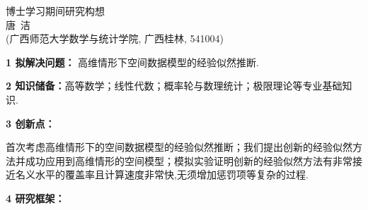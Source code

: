\documentclass[cs4size]{article}
\renewcommand{\thefootnote}{\fnsymbol{footnote}}
\begin{document}
\setcounter{page}{1} %
\fancyhf{} %
\renewcommand\headrulewidth{0.4pt} %
\begin{center}
{{\LARGE\heiti 博士学习期间研究构想}\\[0.6cm]
{\normalsize 唐\ 洁\footnotemark[1]}\\[0.1cm]}
{\small(广西师范大学数学与统计学院, 广西桂林, 541004)}
\end{center}
\renewcommand{\thefootnote}{\fnsymbol{footnote}} %

\vspace*{1cm}

\noindent
{\bf  1 拟解决问题：}{ 高维情形下空间数据模型的经验似然推断.}

\noindent
{\bf  2 知识储备：}{高等数学；线性代数；概率轮与数理统计；极限理论等专业基础知识.}

\noindent
{\bf  3 创新点：}

首次考虑高维情形下的空间数据模型的经验似然推断；我们提出创新的经验似然方法并成功应用到高维情形的空间模型；模拟实验证明创新的经验似然方法有非常接近名义水平的覆盖率且计算速度非常快,无须增加惩罚项等复杂的过程.

\noindent
{\bf  4 研究框架：}
\end{document}
